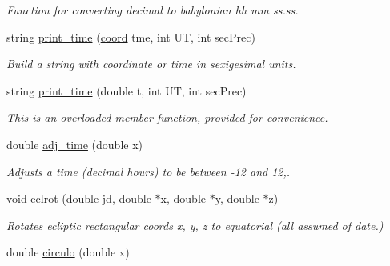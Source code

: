 \begin{DoxyCompactItemize}
\begin{DoxyCompactList}\small\item\em Function for converting decimal to babylonian hh mm ss.\-ss. \end{DoxyCompactList}\item 
string \hyperlink{class_astronomy_aae429e427a23bf900087bbbe36e91b3a}{print\-\_\-time} (\hyperlink{struct_astronomy_1_1coord}{coord} tme, int U\-T, int sec\-Prec)
\begin{DoxyCompactList}\small\item\em Build a string with coordinate or time in sexigesimal units. \end{DoxyCompactList}\item 
string \hyperlink{class_astronomy_aef8e948a098f5ab5b6f8a2fed84b4ecf}{print\-\_\-time} (double t, int U\-T, int sec\-Prec)
\begin{DoxyCompactList}\small\item\em This is an overloaded member function, provided for convenience. \end{DoxyCompactList}\item 
double \hyperlink{class_astronomy_a2d9c4204f75221388de8ff5ab3640c4e}{adj\-\_\-time} (double x)
\begin{DoxyCompactList}\small\item\em Adjusts a time (decimal hours) to be between -\/12 and 12,. \end{DoxyCompactList}\item 
\hypertarget{class_astronomy_ab567bdcf3f5d0175ba5d2eed40a5f7aa}{void \hyperlink{class_astronomy_ab567bdcf3f5d0175ba5d2eed40a5f7aa}{eclrot} (double jd, double $\ast$x, double $\ast$y, double $\ast$z)}\label{class_astronomy_ab567bdcf3f5d0175ba5d2eed40a5f7aa}

\begin{DoxyCompactList}\small\item\em Rotates ecliptic rectangular coords x, y, z to equatorial (all assumed of date.) \end{DoxyCompactList}\item 
\hypertarget{class_astronomy_a141c56c4a2533f65ff495a152997d25c}{double \hyperlink{class_astronomy_a141c56c4a2533f65ff495a152997d25c}{circulo} (double x)}\label{class_astronomy_a141c56c4a2533f65ff495a152997d25c}


\end{DoxyCompactItemize}
